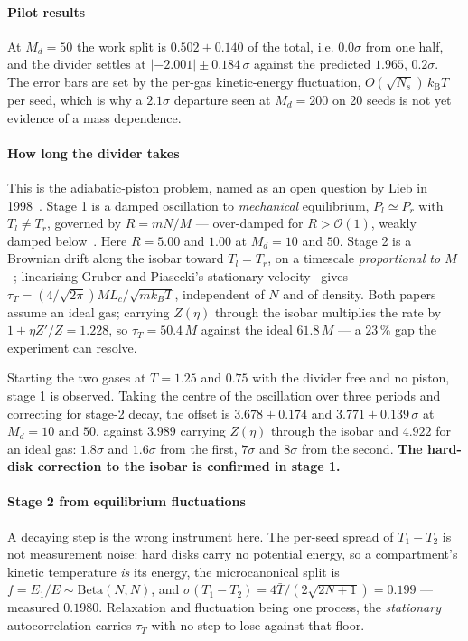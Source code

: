 \documentclass[journal]{IEEEtran}
\newcommand{\kT}{k_{\mathrm B}T}
\begin{document}
\paragraph{Pilot results} At $M_d = 50$ the work split is $0.502 \pm 0.140$ of the total, i.e.
$0.0\sigma$ from one half, and the divider settles at $|{-2.001}| \pm 0.184\,\sigma$ against the
predicted $1.965$, $0.2\sigma$. The error bars are set by the per-gas kinetic-energy fluctuation,
$O(\sqrt{N_s})\,\kT$ per seed, which is why a $2.1\sigma$ departure seen at $M_d = 200$ on 20 seeds
is not yet evidence of a mass dependence.

\paragraph{How long the divider takes} This is the adiabatic-piston problem, named as an open
question by Lieb in 1998~\cite{cencini2007}. Stage 1 is a damped oscillation to \emph{mechanical}
equilibrium, $P_l \simeq P_r$ with $T_l \neq T_r$, governed by $R = mN/M$ --- over-damped for
$R > \mathcal{O}(1)$, weakly damped below~\cite{cencini2007,crosignani1996}. Here $R = 5.00$ and
$1.00$ at $M_d = 10$ and $50$. Stage 2 is a Brownian drift along the isobar toward $T_l = T_r$, on a
timescale \emph{proportional to $M$}~\cite{cencini2007}; linearising Gruber and Piasecki's
stationary velocity~\cite{gruber1999} gives $\tau_T = (4/\sqrt{2\pi})ML_c/\sqrt{mk_BT}$, independent
of $N$ and of density. Both papers assume an ideal gas; carrying $Z(\eta)$ through the isobar
multiplies the rate by $1 + \eta Z'/Z = 1.228$, so $\tau_T = 50.4\,M$ against the ideal $61.8\,M$ ---
a $23\,\%$ gap the experiment can resolve.

Starting the two gases at $T = 1.25$ and $0.75$ with the divider free and no piston, stage 1 is
observed. Taking the centre of the oscillation over three periods and correcting for stage-2 decay,
the offset is $3.678 \pm 0.174$ and $3.771 \pm 0.139\,\sigma$ at $M_d = 10$ and $50$, against
$3.989$ carrying $Z(\eta)$ through the isobar and $4.922$ for an ideal gas: $1.8\sigma$ and
$1.6\sigma$ from the first, $7\sigma$ and $8\sigma$ from the second. \textbf{The hard-disk
correction to the isobar is confirmed in stage 1.}

\paragraph{Stage 2 from equilibrium fluctuations} A decaying step is the wrong instrument here. The
per-seed spread of $T_1 - T_2$ is not measurement noise: hard disks carry no potential energy, so a
compartment's kinetic temperature \emph{is} its energy, the microcanonical split is
$f = E_1/E \sim \mathrm{Beta}(N,N)$, and $\sigma(T_1-T_2) = 4\bar T/(2\sqrt{2N+1}) = 0.199$ ---
measured $\mathbf{0.1980}$. Relaxation and fluctuation being one process, the \emph{stationary}
autocorrelation carries $\tau_T$ with no step to lose against that floor.
\end{document}
